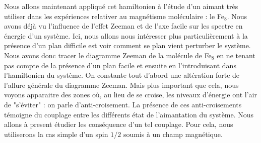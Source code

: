 Nous allons maintenant appliqué cet hamiltonien à l'étude d'un aimant très utiliser dans les expériences relativer au magnétisme moléculaire : le Fe$_8$. Nous avons déjà vu l'influence de l'effet Zeeman et de l'axe facile sur les spectre en énergie d'un système. Ici, nous allons nous intéresser plus particulièrement à la présence d'un plan difficile est voir comment se plan vient perturber le système. Nous avons donc tracer le diagramme Zeeman de la molécule de Fe$_8$ en ne tenant pas compte de la présence d'un plan facile et ensuite en l'introduisant dans l'hamiltonien du système. On constante tout d'abord une altération forte de l'allure générale du diagramme Zeeman. Mais plus important que cela, nous voyons apparaitre des zones où, au lieu de se croise, les niveaux d'énergie ont l'air de "s'éviter" : on parle d'anti-croisement. La présence de ces anti-croisements témoigne du couplage entre les différents état de l'aimantation du système. Nous allons à present étudier les conséquence d'un tel couplage. Pour cela, nous utiliserons la cas simple d'un spin $1/2$ soumis à un champ magnétique.